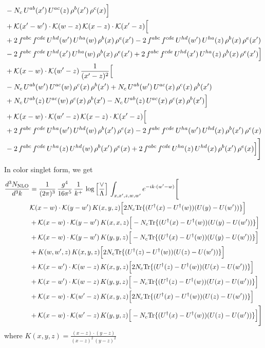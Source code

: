 \documentclass[9pt]{article}
\numberwithin{equation}{section}
\begin{document}
\begin{align}
& -N_{c}\,U^{ab}(x')\,U^{ac}(z)\,\rho^{b}(x')\,\rho^{c}(x)\Big]\notag\\
& +\mathcal{K}(x'-w')\cdot\mathcal{K}(w-z)\,\mathcal{K}(x-z)\cdot\mathcal{K}(x'-z)\Big[\notag\\
& +2\,f^{abc}\,f^{cde}\,U^{hd}(w')\,U^{ha}(w)\,\rho^{b}(x)\,\rho^{e}(x') -2\,f^{abc}\,f^{cde}\,U^{hd}(w')\,U^{ha}(z)\,\rho^{b}(x)\,\rho^{e}(x')\notag\\
& -2\,f^{abc}\,f^{cde}\,U^{hd}(x')\,U^{ha}(w)\,\rho^{b}(x)\,\rho^{e}(x') +2\,f^{abc}\,f^{cde}\,U^{hd}(x')\,U^{ha}(z)\,\rho^{b}(x)\,\rho^{e}(x')\Big]\notag\\
& +\mathcal{K}(x-w)\cdot\mathcal{K}(w'-z)\,\frac{1}{(x'-z)^{2}}\Big[\notag\\
& -N_{c}\,U^{ab}(w')\,U^{ac}(w)\,\rho^{c}(x)\,\rho^{b}(x') +N_{c}\,U^{ab}(w')\,U^{ac}(x)\,\rho^{c}(x)\,\rho^{b}(x')\notag\\
& +N_{c}\,U^{ab}(z)\,U^{ac}(w)\,\rho^{c}(x)\,\rho^{b}(x') -N_{c}\,U^{ab}(z)\,U^{ac}(x)\,\rho^{c}(x)\,\rho^{b}(x')\Big]\notag\\
& +\mathcal{K}(x-w)\cdot\mathcal{K}(w'-z)\,\mathcal{K}(x-z)\cdot\mathcal{K}(x'-z)\Big[\notag\\
& +2\,f^{abc}\,f^{cde}\,U^{ha}(w')\,U^{hd}(w)\,\rho^{b}(x')\,\rho^{e}(x) -2\,f^{abc}\,f^{cde}\,U^{ha}(w')\,U^{hd}(x)\,\rho^{b}(x')\,\rho^{e}(x)\notag\\
& -2\,f^{abc}\,f^{cde}\,U^{ha}(z)\,U^{hd}(w)\,\rho^{b}(x')\,\rho^{e}(x) +2\,f^{abc}\,f^{cde}\,U^{ha}(z)\,U^{hd}(x)\,\rho^{b}(x')\,\rho^{e}(x)\Big]\Bigg]
\end{align}
In color singlet form, we get
\begin{align}
\frac{d^{3}N_{\mathrm{NLO}}}{d^{3}k} & = \frac{1}{(2\pi)^{3}}\,\frac{g^{4}}{16\pi^{5}}\,\frac{1}{k^{+}}\,\log\Big[\frac{\vee}{\Lambda}\Big]\,\int_{x,x',z,w,w'}e^{-ik\cdot(w'-w)}\Bigg[ \notag\\ & \mathcal K(x-w)\cdot\mathcal K(y-w')\,K(x,y,z)\Big[2 N_{c}{\rm Tr}\{(U^\dagger(x)-U^\dagger(w))(U(y)-U(w'))\}\Big]\notag\\
&+\mathcal K(x-w)\cdot\mathcal K(y-w')\,K(x,x,z)\Big[-N_{c}{\rm Tr}\{(U^\dagger(x)-U^\dagger(w))(U(y)-U(w'))\}\Big]\notag\\
&+\mathcal K(x-w)\cdot\mathcal K(y-w')\,K(y,y,z)\Big[-N_{c}{\rm Tr}\{(U^\dagger(x)-U^\dagger(w))(U(y)-U(w'))\}\Big]\notag\\
&+K(w,w',z)\,K(x,y,z)\Big[2 N_{c}{\rm Tr}\{(U^\dagger(z)-U^\dagger(w))(U(z)-U(w'))\}\Big]\notag\\
&+\mathcal K(x-w')\cdot\mathcal K(w-z)\,K(x,y,z)\Big[2 N_{c}{\rm Tr}\{(U^\dagger(z)-U^\dagger(w))(U(x)-U(w'))\}\Big]\notag\\
&+\mathcal K(x-w')\cdot\mathcal K(w-z)\,K(y,y,z)\Big[-N_{c}{\rm Tr}\{(U^\dagger(z)-U^\dagger(w))(U(x)-U(w'))\}\Big]\notag\\
&+\mathcal K(x-w)\cdot\mathcal K(w'-z)\,K(x,y,z)\Big[2 N_{c}{\rm Tr}\{(U^\dagger(x)-U^\dagger(w))(U(z)-U(w'))\}\Big]\notag\\
&+\mathcal K(x-w)\cdot\mathcal K(w'-z)\,K(y,y,z)\Big[-N_{c}{\rm Tr}\{(U^\dagger(x)-U^\dagger(w))(U(z)-U(w'))\}\Big]\Bigg]
\end{align}
where $K(x,y,z) = \frac{(x-z)\cdot (y-z)}{(x-z)^{2}\, (y-z)^{2}}$
\end{document}
